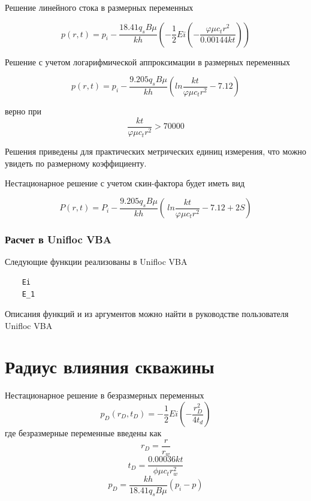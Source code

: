 Решение линейного стока в размерных переменных

\begin{equation}
p\left(r,t\right)=p_i-\frac{18.41q_sB\mu}{kh}\left(-\frac{1}{2}Ei\left(-\frac{\varphi\mu c_tr^2}{0.00144kt}\right)\right) 
\end{equation}

Решение с учетом логарифмической аппроксимации в размерных переменных

\begin{equation}
p\left(r,t\right)=p_i-\frac{9.205q_sB\mu}{kh}\left(ln{\frac{kt}{\varphi\mu c_tr^2}}-7.12\right)
\end{equation}

верно при 
$$\frac{kt}{\varphi\mu c_tr^2}>70000 $$

Решения приведены для практических метрических единиц измерения, что можно увидеть по размерному коэффициенту. 

Нестационарное решение с учетом скин-фактора будет иметь вид


\begin{equation} 
P(r, t) = P_{i} - \frac {9.205 {q_s} B\mu }{k h}(\ ln\frac {k t}{ \varphi \mu {c_t} {r^2}} -7.12 + 2S) 
\end{equation}



\subsubsection{Расчет в Unifloc VBA}

Следующие функции реализованы в Unifloc VBA

\begin{verbatim}
	Ei
	E_1
\end{verbatim}	

Описания функций и из аргументов можно найти в руководстве пользователя  Unifloc VBA



\section{Радиус влияния скважины}


Нестационарное решение в безразмерных переменных
$$ 
p_D(r_D,t_D) = - \frac{1}{2} Ei \left(- \dfrac{ r_D^2}{4t_d} \right)
$$
где безразмерные переменные введены как
$$ r_D = \frac{r}{r_w}  $$
$$ t_D = \frac{0.00036 kt}{\phi \mu c_t r_w^2}  $$
$$ p_D = \frac{kh}{ 18.41 q_s B \mu} \left( p_i - p \right)   $$

